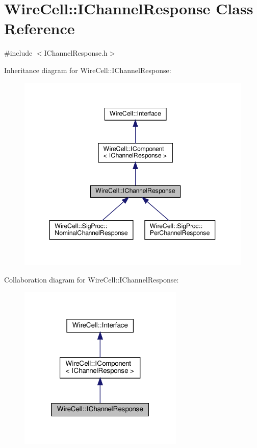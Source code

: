\hypertarget{class_wire_cell_1_1_i_channel_response}{}\section{Wire\+Cell\+:\+:I\+Channel\+Response Class Reference}
\label{class_wire_cell_1_1_i_channel_response}


{\ttfamily \#include $<$I\+Channel\+Response.\+h$>$}



Inheritance diagram for Wire\+Cell\+:\+:I\+Channel\+Response\+:
\nopagebreak
\begin{figure}[H]
\begin{center}
\leavevmode
\includegraphics[width=344pt]{class_wire_cell_1_1_i_channel_response__inherit__graph}
\end{center}
\end{figure}


Collaboration diagram for Wire\+Cell\+:\+:I\+Channel\+Response\+:
\nopagebreak
\begin{figure}[H]
\begin{center}
\leavevmode
\includegraphics[width=223pt]{class_wire_cell_1_1_i_channel_response__coll__graph}
\end{center}
\end{figure}
